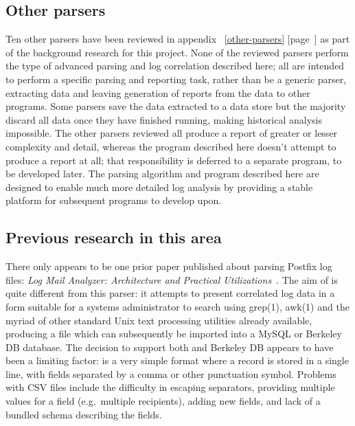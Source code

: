 \documentclass[a4paper,12pt,draft]{article}
\newcommand{\refwithpage}[1]{%
    \empty{}\ref{#1} [page~\pageref{#1}]%
}
\begin{document}
\subsection{Other parsers}

Ten other parsers have been reviewed in
appendix~\refwithpage{other-parsers} as part of the background research for
this project.  None of the reviewed parsers perform the type of advanced
parsing and log correlation described here; all are intended to perform a
specific parsing and reporting task, rather than be a generic parser,
extracting data and leaving generation of reports from the data to other
programs.  Some parsers save the data extracted to a data store but the
majority discard all data once they have finished running, making
historical analysis impossible.  The other parsers reviewed all produce a
report of greater or lesser complexity and detail, whereas the program
described here doesn't attempt to produce a report at all; that
responsibility is deferred to a separate program, to be developed later.
The parsing algorithm and program described here are designed to enable
much more detailed log analysis by providing a stable platform for
subsequent programs to develop upon.



\subsection{Previous research in this area}

\label{prior art}

There only appears to be one prior paper published about parsing Postfix
log files: \textit{Log Mail Analyzer: Architecture and Practical
Utilizations\/}~\cite{log-mail-analyser}.  The aim of \LMA{} is quite
different from this parser: it attempts to present correlated log data in a
form suitable for a systems administrator to search using grep(1), awk(1)
and the myriad of other standard Unix text processing utilities already
available, producing a \CSV{} file which can subsequently be imported into
a MySQL or Berkeley DB database.  The decision to support both \CSV{} and
Berkeley DB appears to have been a limiting factor: \CSV{} is a very simple
format where a record is stored in a single line, with fields separated by
a comma or other punctuation symbol.  Problems with CSV files include the
difficulty in escaping separators, providing multiple values for a field
(e.g.\ multiple recipients), adding new fields, and lack of a bundled
schema describing the fields.
\end{document}
